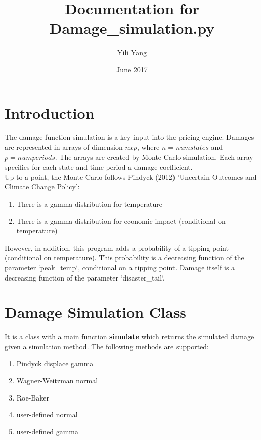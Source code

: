 \documentclass[12pt]{article}
\title{Documentation for Damage\_simulation.py}
\author{Yili Yang}
\date{June 2017}
\begin{document}
\maketitle

\section{Introduction}

   The damage function simulation is a key input into the pricing engine. Damages are
    represented in arrays of dimension $n x p$, where $n = num states$ and $p = num periods$.
    The arrays are created by Monte Carlo simulation. Each array specifies for each state
    and time period a damage coefficient.\\

    Up to a point, the Monte Carlo follows Pindyck (2012) 'Uncertain Outcomes and Climate Change
    Policy':\begin{enumerate}
              \item There is a gamma distribution for temperature
              \item There is a gamma distribution for economic impact (conditional on temperature)
            \end{enumerate}

    However, in addition, this program adds a probability of a tipping point (conditional on temperature).
    This probability is a decreasing function of the parameter `peak\_temp`, conditional on a tipping
    point. Damage itself is a decreasing function of the parameter `disaster\_tail`.
\section{Damage Simulation Class}
It is a class with a main function \textbf{simulate} which returns the simulated damage given a simulation method.
The following methods are supported:
\begin{enumerate}
  \item Pindyck displace gamma
  \item Wagner-Weitzman normal
  \item Roe-Baker
  \item user-defined normal
  \item user-defined gamma
\end{enumerate}
\end{document}
